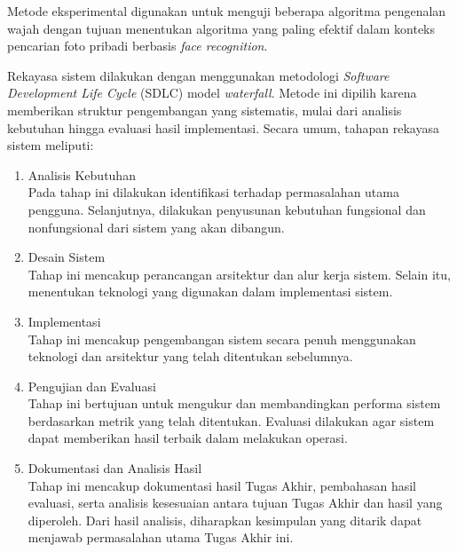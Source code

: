 Metode eksperimental digunakan untuk menguji beberapa algoritma pengenalan wajah dengan tujuan menentukan algoritma yang paling efektif dalam konteks pencarian foto pribadi berbasis \textit{face recognition}.

Rekayasa sistem dilakukan dengan menggunakan metodologi \textit{Software Development Life Cycle} (SDLC) model \textit{waterfall}. Metode ini dipilih karena memberikan struktur pengembangan yang sistematis, mulai dari analisis kebutuhan hingga evaluasi hasil implementasi. Secara umum, tahapan rekayasa sistem meliputi:

\begin{enumerate}
    \item Analisis Kebutuhan \\
    Pada tahap ini dilakukan identifikasi terhadap permasalahan utama pengguna. Selanjutnya, dilakukan penyusunan kebutuhan fungsional dan nonfungsional dari sistem yang akan dibangun.
    
    \item Desain Sistem \\
    Tahap ini mencakup perancangan arsitektur dan alur kerja sistem. Selain itu, menentukan teknologi yang digunakan dalam implementasi sistem.
    
    \item Implementasi \\
    Tahap ini mencakup pengembangan sistem secara penuh menggunakan teknologi dan arsitektur yang telah ditentukan sebelumnya.
    
    \item Pengujian dan Evaluasi \\
    Tahap ini bertujuan untuk mengukur dan membandingkan performa sistem berdasarkan metrik yang telah ditentukan. Evaluasi dilakukan agar sistem dapat memberikan hasil terbaik dalam melakukan operasi.
    
    \item Dokumentasi dan Analisis Hasil \\
    Tahap ini mencakup dokumentasi hasil Tugas Akhir, pembahasan hasil evaluasi, serta analisis kesesuaian antara tujuan Tugas Akhir dan hasil yang diperoleh. Dari hasil analisis, diharapkan kesimpulan yang ditarik dapat menjawab permasalahan utama Tugas Akhir ini.
\end{enumerate}

